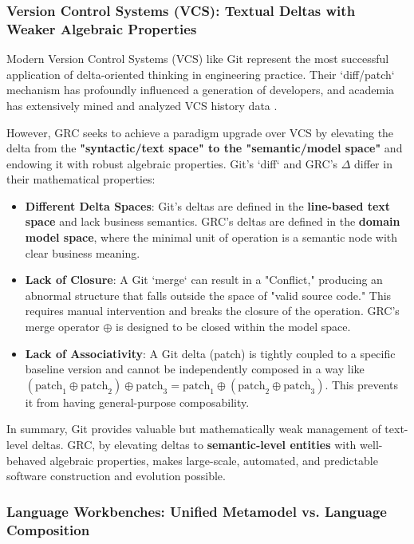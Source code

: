 \documentclass[11pt]{article}
\begin{document}
\subsubsection{Version Control Systems (VCS): Textual Deltas with Weaker Algebraic Properties}

Modern Version Control Systems (VCS) like Git represent the most successful application of delta-oriented thinking in engineering practice. Their `diff/patch` mechanism has profoundly influenced a generation of developers, and academia has extensively mined and analyzed VCS history data \cite{gousios2013}.

However, GRC seeks to achieve a paradigm upgrade over VCS by elevating the delta from the \textbf{"syntactic/text space" to the "semantic/model space"} and endowing it with robust algebraic properties. Git's `diff` and GRC's $\Delta$ differ in their mathematical properties:
\begin{itemize}
    \item \textbf{Different Delta Spaces}: Git's deltas are defined in the \textbf{line-based text space} and lack business semantics. GRC's deltas are defined in the \textbf{domain model space}, where the minimal unit of operation is a semantic node with clear business meaning.
    \item \textbf{Lack of Closure}: A Git `merge` can result in a "Conflict," producing an abnormal structure that falls outside the space of "valid source code." This requires manual intervention and breaks the closure of the operation. GRC's merge operator $\oplus$ is designed to be closed within the model space.
    \item \textbf{Lack of Associativity}: A Git delta (patch) is tightly coupled to a specific baseline version and cannot be independently composed in a way like $(\text{patch}_1 \oplus \text{patch}_2) \oplus \text{patch}_3 = \text{patch}_1 \oplus (\text{patch}_2 \oplus \text{patch}_3)$. This prevents it from having general-purpose composability.
\end{itemize}

In summary, Git provides valuable but mathematically weak management of text-level deltas. GRC, by elevating deltas to \textbf{semantic-level entities} with well-behaved algebraic properties, makes large-scale, automated, and predictable software construction and evolution possible.

\subsubsection{Language Workbenches: Unified Metamodel vs. Language Composition}
\end{document}

